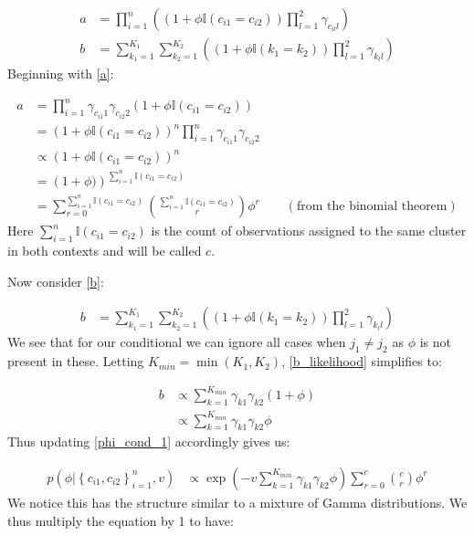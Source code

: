 \documentclass[11pt]{article} %
\begin{document}
\begin{align}
a &=  \prod_{i = 1}^n \left(\left(1 + \phi \mathbb{I}(c_{i1} = c_{i2})\right) \prod_{l = 1}^{2}\gamma_{c_{il}l}\right)  \label{a} \\
b &=  \sum_{k_1=1}^{K_1}\sum_{k_2=1}^{K_2}\left(\left(1 + \phi\mathbb{I}(k_1 = k_2)\right) \prod_{l=1}^2\gamma_{k_ll}\right) \label{b}
\end{align}
Beginning with \eqref{a}:

\begin{align}
a &= \prod_{i = 1}^n \gamma_{c_{i1}1} \gamma_{c_{i2}2}  \left(1 + \phi \mathbb{I}(c_{i1} = c_{i2})\right) \\
 &= \left(1 + \phi \mathbb{I}(c_{i1} = c_{i2})\right)^n \prod_{i = 1}^n \gamma_{c_{i1}1} \gamma_{c_{i2}2} \\
 &\propto  \left(1 + \phi \mathbb{I}(c_{i1} = c_{i2})\right)^n \\
 &=  \left(1 + \phi)\right)^{\sum_{i=1}^n  \mathbb{I}(c_{i1} = c_{i2})} \\
 &= \sum_{r=0}^{\sum_{i=1}^n  \mathbb{I}(c_{i1} = c_{i2})} \binom{\sum_{i=1}^n  \mathbb{I}(c_{i1} = c_{i2})}{r} \phi^r \qquad (\text{from the binomial theorem})
\end{align}
Here $\sum_{i=1}^n  \mathbb{I}(c_{i1} = c_{i2})$ is the count of observations assigned to the same cluster in both contexts and will be called $c$.

Now consider \eqref{b}:

\begin{align} \label{b_likelihood}
b &=  \sum_{k_1=1}^{K_1}\sum_{k_2=1}^{K_2}\left(\left(1 + \phi\mathbb{I}(k_1 = k_2)\right) \prod_{l=1}^2\gamma_{k_ll}\right)
\end{align}
We see that for our conditional we can ignore all cases when $j_1 \neq j_2$ as $\phi$ is not present in these. Letting $K_{min} = \min(K_1,K_2)$, \eqref{b_likelihood} simplifies to:

\begin{align}
b &\propto \sum_{k=1}^{K_{min}}\gamma_{k1} \gamma_{k2} \left(1 + \phi\right) \\
&\propto \sum_{k=1}^{K_{min}} \gamma_{k1} \gamma_{k2} \phi
\end{align}
Thus updating \eqref{phi_cond_1} accordingly gives us:

\begin{align}
p(\phi | \left\{c_{i1}, c_{i2}\right\}_{i=1}^n, v) &\propto \exp\left(-v \sum_{k=1}^{K_{min}}\gamma_{k1} \gamma_{k2}\phi\right)  \sum_{r=0}^c \binom{c}{r} \phi^r
\end{align}
We notice this has the structure similar to a mixture of Gamma distributions. We thus multiply the equation by 1 to have:
\end{document}
